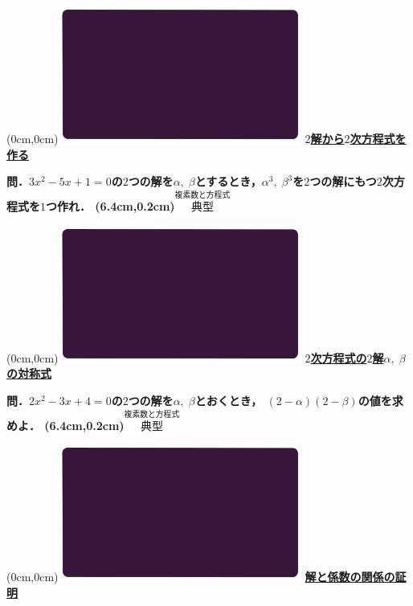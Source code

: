 \documentclass[10pt,
fleqn,
dvipdfmx,
uplatex
]{jsarticle}
\begin{document}
\newpage



\at(0cm,0cm){\includegraphics[width=8cm,bb=0 0 1920 1080]{./youtube/thumbnails/templates/smart_background/複素数と方程式.jpeg}}
{\color{orange}\bf\boldmath\LARGE\underline{$2$解から$2$次方程式を作る}}\vspace{0.3zw}

\LARGE 
\bf\boldmath 問．$3x^2-5x+1=0$の$2$つの解を$\alpha ,\;\beta$とするとき，$\alpha ^3,\;\beta ^3$を$2$つの解にもつ$2$次方程式を$1$つ作れ．
\at(6.4cm,0.2cm){\small\color{bradorange}$\overset{\text{複素数と方程式}}{\text{典型}}$}


\newpage



\at(0cm,0cm){\includegraphics[width=8cm,bb=0 0 1920 1080]{./youtube/thumbnails/templates/smart_background/複素数と方程式.jpeg}}
{\color{orange}\bf\boldmath\Large\underline{$2$次方程式の$2$解$\alpha ,\;\beta$の対称式}}\vspace{0.3zw}

\Large 
\bf\boldmath 問．$2x^2-3x+4=0$の$2$つの解を$\alpha ,\;\beta$とおくとき，
$\left(2-\alpha \right)\left(2-\beta \right)$の値を求めよ．
\at(6.4cm,0.2cm){\small\color{bradorange}$\overset{\text{複素数と方程式}}{\text{典型}}$}


\newpage



\at(0cm,0cm){\includegraphics[width=8cm,bb=0 0 1920 1080]{./youtube/thumbnails/templates/smart_background/複素数と方程式.jpeg}}
{\color{orange}\bf\boldmath\LARGE\underline{解と係数の関係の証明}}\vspace{0.3zw}
\end{document}
